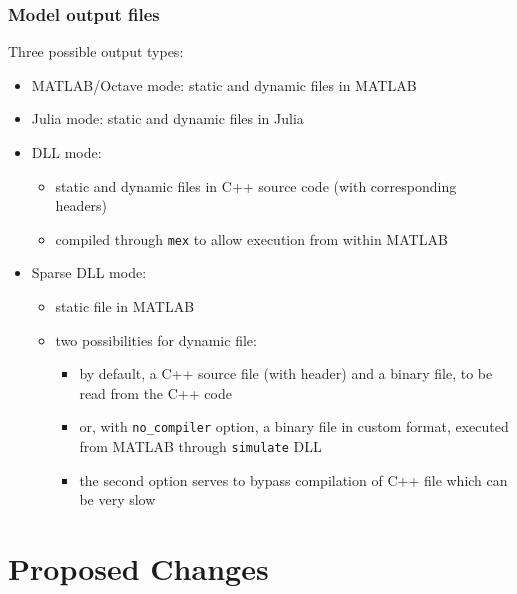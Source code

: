 \documentclass{beamer}
\begin{document}
\begin{frame}
  \frametitle{Model output files}
  Three possible output types:
  \begin{itemize}
  \item MATLAB/Octave mode: static and dynamic files in MATLAB
  \item Julia mode: static and dynamic files in Julia
  \item DLL mode:
    \begin{itemize}
    \item static and dynamic files in C++ source code (with corresponding headers)
    \item compiled through \texttt{mex} to allow execution from within MATLAB
    \end{itemize}
  \item Sparse DLL mode:
    \begin{itemize}
    \item static file in MATLAB
    \item two possibilities for dynamic file:
      \begin{itemize}
      \item by default, a C++ source file (with header) and a binary file, to be read from the C++ code
      \item or, with \texttt{no\_compiler} option, a binary file in custom format, executed from MATLAB through \texttt{simulate} DLL
      \item the second option serves to bypass compilation of C++ file which can be very slow
      \end{itemize}
    \end{itemize}
  \end{itemize}
\end{frame}

\section{Proposed Changes}

\newcommand{\asuivre}{\setcounter{sauvegardeenumi}{\theenumi}}
\newcommand{\suite}{\setcounter{enumi}{\thesauvegardeenumi}}
\end{document}
